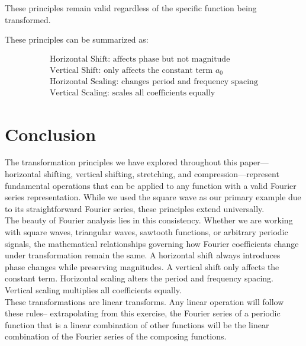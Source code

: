 \documentclass{article}
\begin{document}
These principles remain valid regardless of the specific function being transformed.

These principles can be summarized as:

\begin{align}
\text{Horizontal Shift: affects phase but not magnitude} \\
\text{Vertical Shift: only affects the constant term } a_0 \\
\text{Horizontal Scaling: changes period and frequency spacing} \\
\text{Vertical Scaling: scales all coefficients equally}
\end{align}

\section{Conclusion}
The transformation principles we have explored throughout this paper—horizontal shifting, vertical shifting, stretching, and compression—represent fundamental operations that can be applied to any function with a valid Fourier series representation. While we used the square wave as our primary example due to its straightforward Fourier series, these principles extend universally.\\

The beauty of Fourier analysis lies in this consistency. Whether we are working with square waves, triangular waves, sawtooth functions, or arbitrary periodic signals, the mathematical relationships governing how Fourier coefficients change under transformation remain the same. A horizontal shift always introduces phase changes while preserving magnitudes. A vertical shift only affects the constant term. Horizontal scaling alters the period and frequency spacing. Vertical scaling multiplies all coefficients equally.\\

These transformations are linear transforms. Any linear operation will follow these rules-- extrapolating from this exercise, the Fourier series of a periodic function that is a linear combination of other functions will be the linear combination of the Fourier series of the composing functions.\\
\end{document}
